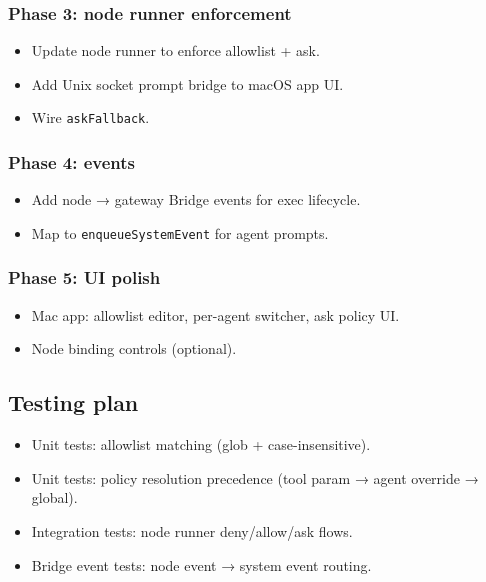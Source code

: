 \subsubsection{Phase 3: node runner enforcement}


\begin{itemize}
  \item Update node runner to enforce allowlist + ask.
  \item Add Unix socket prompt bridge to macOS app UI.
  \item Wire \texttt{askFallback}.
\end{itemize}


\subsubsection{Phase 4: events}


\begin{itemize}
  \item Add node → gateway Bridge events for exec lifecycle.
  \item Map to \texttt{enqueueSystemEvent} for agent prompts.
\end{itemize}


\subsubsection{Phase 5: UI polish}


\begin{itemize}
  \item Mac app: allowlist editor, per-agent switcher, ask policy UI.
  \item Node binding controls (optional).
\end{itemize}


\subsection{Testing plan}


\begin{itemize}
  \item Unit tests: allowlist matching (glob + case-insensitive).
  \item Unit tests: policy resolution precedence (tool param → agent override → global).
  \item Integration tests: node runner deny/allow/ask flows.
  \item Bridge event tests: node event → system event routing.
\end{itemize}


